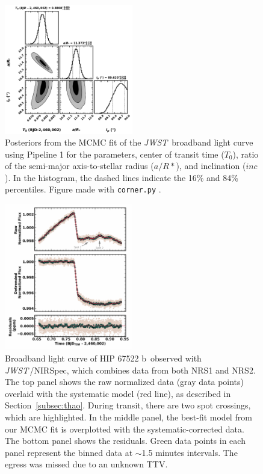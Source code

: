 \documentclass[twocolumn]{aastex63} %
\newcommand{\jwst}{\textit{JWST}}
\newcommand{\plname}{HIP 67522 b}
\begin{document}
\begin{figure}[ht]
    \centering
    \includegraphics[width=0.50\textwidth]{hip67522b_broadband_lc_corner_v3.pdf}
    \caption{Posteriors from the MCMC fit of the \jwst\, broadband light curve using Pipeline 1 for the parameters, center of transit time ($T_{0}$), ratio of the semi-major axis-to-stellar radius ($a/R{*}$), and inclination ($\textit{inc}$). In the histogram, the dashed lines indicate the 16\% and 84\% percentiles.  Figure made with \texttt{corner.py} \citep{foreman2016corner}. 
    \label{fig:white_lc_corner}}
\end{figure} 

\begin{figure}[ht]
    \centering
    \includegraphics[width=0.50\textwidth]{white_lc_combined_v4.pdf}
    \caption{Broadband light curve of \plname\, observed with \jwst\,/NIRSpec, which combines data from both NRS1 and NRS2. The top panel shows the raw normalized data (gray data points) overlaid with the systematic model (red line), as described in Section~\ref{subsec:thao}. During transit, there are two spot crossings, which are highlighted. In the middle panel, the best-fit model from our MCMC fit is overplotted with the systematic-corrected data. The bottom panel shows the residuals. Green data points in each panel represent the binned data at $\sim$1.5 minutes intervals. The egress was missed due to an unknown TTV.
    \label{fig:white_lc}}
\end{figure} 
\end{document}
